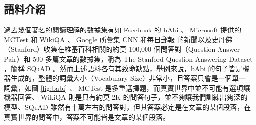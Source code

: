 %
\subsection{語料介紹}
過去幾個著名的閱讀理解的數據集有如 Facebook 的 bAbi \cite{weston2015towards}  、 Microsoft 提供的 MCTest \cite{richardson2013mctest} 和 WikiQA \cite{yang2015wikiqa} 、 Google 所彙集 CNN 和每日郵報 \cite{hermann2015teaching} 的新聞以及史丹佛（Stanford）收集在維基百科相關的約莫 100,000 個問答對（Question-Answer Pair）和 500 多篇文章的數據集，稱為 The Stanford Question Answering Dataset ，簡稱 SQuAD \cite{rajpurkar2016squad} 。然而上述語料各有其致命缺點，舉例來說，bAbi 的句子皆是機器生成的，整體的詞彙大小（Vocabulary Size）非常小，且答案只會是一個單一詞彙，如圖 \ref{fig:babi} 、 MCTest 是多重選擇題，而真實世界中並不可能有選項讓機器回答、 WikiQA 則是只有約莫 2K 的問答句子，並不夠讓我們訓練出夠深的模型、SQuAD 雖然有十萬左右的問答對，但其答案必定是在文章的某個段落，在真實世界的問答中，答案不可能皆是文章的某個段落。

